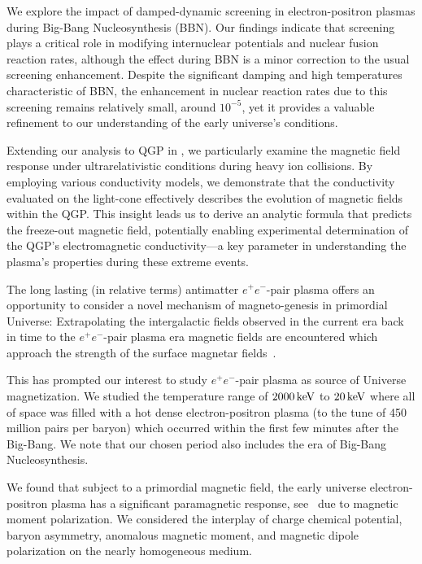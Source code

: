 We explore the impact of damped-dynamic screening in electron-positron plasmas during Big-Bang Nucleosynthesis (BBN). Our findings indicate that screening plays a critical role in modifying internuclear potentials and nuclear fusion reaction rates, although the effect during BBN is a minor correction to the usual screening enhancement. Despite the significant damping and high temperatures characteristic of BBN, the enhancement in nuclear reaction rates due to this screening remains relatively small, around $10^{-5}$, yet it provides a valuable refinement to our understanding of the early universe's conditions.

Extending our analysis to QGP in , we particularly examine the magnetic field response under ultrarelativistic conditions during heavy ion collisions. By employing various conductivity models, we demonstrate that the conductivity evaluated on the light-cone effectively describes the evolution of magnetic fields within the QGP. This insight leads us to derive an analytic formula that predicts the freeze-out magnetic field, potentially enabling experimental determination of the QGP's electromagnetic conductivity—a key parameter in understanding the plasma's properties during these extreme events.


The long lasting (in relative terms) antimatter $e^+e^-$-pair  plasma offers an opportunity to consider a novel mechanism of magneto-genesis in primordial Universe: Extrapolating the intergalactic fields observed in the current era back in time to the $e^+e^-$-pair plasma era magnetic fields are encountered which approach the strength of the surface magnetar fields~.  

This has prompted our interest to study $e^+e^-$-pair plasma as source of Universe magnetization. We studied the temperature range of $2000\text{\,keV}$ to $20\text{\,keV}$ where all of space was filled with a hot dense electron-positron plasma (to the tune of 450 million pairs per baryon) which occurred within the first few minutes after the Big-Bang. We note that our chosen period also includes the era of Big-Bang Nucleosynthesis.

We found that subject to a primordial magnetic field, the early universe electron-positron plasma has a significant paramagnetic response, see~ due to magnetic moment polarization. We considered the interplay of charge chemical potential, baryon asymmetry, anomalous magnetic moment, and magnetic dipole polarization on the nearly homogeneous medium.

